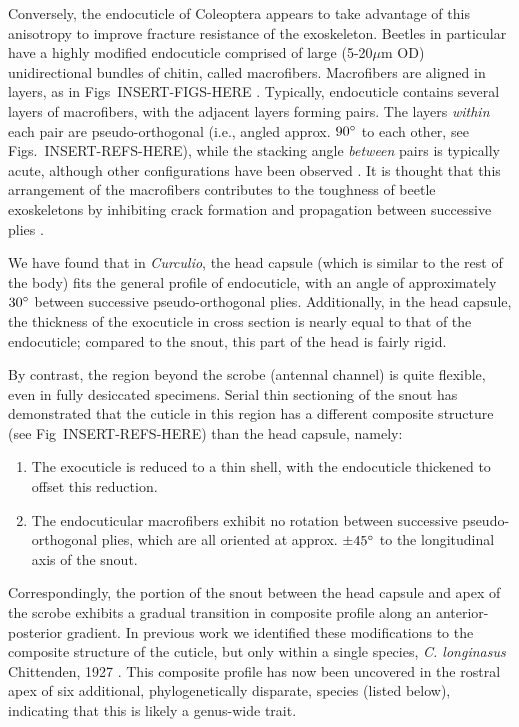 \documentclass[twocolumn, linenumbers, superscriptaddress]{revtex4-1}
\begin{document}
		Conversely, the endocuticle of Coleoptera appears to take advantage of this anisotropy to improve fracture resistance of the exoskeleton.
		Beetles in particular have a highly modified endocuticle comprised of large (5-20$\mu$m OD) unidirectional bundles of chitin, called macrofibers.
		Macrofibers are aligned in layers, as in Figs~INSERT-FIGS-HERE \cite{Kamp2010,Kamp2015}.
		Typically, endocuticle contains several layers of macrofibers, with the adjacent layers forming pairs. 
		The layers \emph{within} each pair are pseudo-orthogonal (i.e., angled approx. $90\degree$ to each other, see Figs.~INSERT-REFS-HERE), while the stacking angle \emph{between} pairs is typically acute, although other configurations have been observed \cite{Hepburn1973,Kamp2010}.
		It is thought that this arrangement of the macrofibers contributes to the toughness of beetle exoskeletons by inhibiting crack formation and propagation between successive plies \cite{Kamp2010,Kamp2015,Hepburn1973}.		
		
		We have found that in \textit{Curculio}, the head capsule (which is similar to the rest of the body) fits the general profile of endocuticle, with an angle of approximately $30\degree$ between successive pseudo-orthogonal plies.
		Additionally, in the head capsule, the thickness of the exocuticle in cross section is nearly equal to that of the endocuticle; compared to the snout, this part of the head is fairly rigid.
		
		By contrast, the region beyond the scrobe (antennal channel) is quite flexible, even in fully desiccated specimens.
		Serial thin sectioning of the snout has demonstrated that the cuticle in this region has a different composite structure (see Fig~INSERT-REFS-HERE) than the head capsule, namely:

		\begin{enumerate}
			\item The exocuticle is reduced to a thin shell, with the endocuticle thickened to offset this reduction.
			\item The endocuticular macrofibers exhibit no rotation between successive pseudo-orthogonal plies, which are all oriented at approx. $\pm45\degree$ to the longitudinal axis of the snout.
		\end{enumerate}
		
		Correspondingly, the portion of the snout between the head capsule and apex of the scrobe exhibits a gradual transition in composite profile along an anterior-posterior gradient.		
		In previous work we identified these modifications to the composite structure of the cuticle, but only within a single species, \textit{C. longinasus} Chittenden, 1927 \cite{Jansen2016, Singh2016}.
		This composite profile has now been uncovered in the rostral apex of six additional, phylogenetically disparate, species (listed below), indicating that this is likely a genus-wide trait.
		
\end{document}
